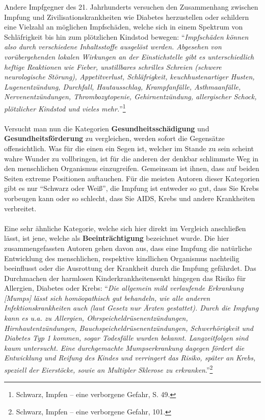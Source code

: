 \documentclass[
    a4paper,
    12pt,
    hyphens,
    chapterprefix=true,
    headheight=33pt,
    footheight=29pt,
    headings=optiontohead, %
]{scrartcl}
\begin{document}
{Andere Impfgegner des 21. Jahrhunderts versuchen den Zusammenhang zwischen Impfung und Zivilisationskrankheiten wie Diabetes herzustellen oder schildern eine Vielzahl an möglichen Impfschäden, welche sich in einem Spektrum von Schläfrigkeit bis hin zum plötzlichen Kindstod bewegen: "`\textit{Impfschäden können also durch verschiedene Inhaltsstoffe ausgelöst werden. Abgesehen von vorübergehenden lokalen Wirkungen an der Einstichstelle gibt es unterschiedlich heftige Reaktionen wie Fieber, unstillbares schrilles Schreien (schwere neurologische Störung), Appetitverlust, Schläfrigkeit, keuchhustenartiger Husten, Lugenentzündung, Durchfall, Hautausschlag, Krampfanfälle, Asthmaanfälle, Nervenentzündungen, Thrombozytopenie, Gehirnentzündung, allergischer Schock, plötzlicher Kindstod und vieles mehr.}"'\footnote{Schwarz, Impfen -- eine verborgene Gefahr, S. 49.}\\
\\
Versucht man nun die Kategorien \textbf{Gesundheitsschädigung} und \textbf{Gesundheitsförderung} zu vergleichen, werden sofort die Gegensätze offensichtlich. Was für die einen ein Segen ist, welcher im Stande zu sein scheint wahre Wunder zu vollbringen, ist für die anderen der denkbar schlimmste Weg in den menschlichen Organismus einzugreifen. Gemeinsam ist ihnen, dass auf beiden Seiten extreme Positionen auftauchen. Für die meisten Autoren dieser Kategorien gibt es nur "`Schwarz oder Weiß"', die Impfung ist entweder so gut, dass Sie Krebs vorbeugen kann oder so schlecht, dass Sie AIDS, Krebs und andere Krankheiten verbreitet. \\
\\
Eine sehr ähnliche Kategorie, welche sich hier direkt im Vergleich anschließen lässt, ist jene, welche als \textbf{Beeinträchtigung} bezeichnet wurde. Die hier zusammengefassten Autoren gehen davon aus, dass eine Impfung die natürliche Entwicklung des menschlichen, respektive kindlichen Organismus nachteilig beeinflusst oder die Ausrottung der Krankheit durch die Impfung gefährdet. Das Durchmachen der \glqq harmlosen Kinderkrankheiten\grqq senkt hingegen das Risiko für Allergien, Diabetes oder Krebs: "`\textit{Die allgemein mild verlaufende Erkrankung [Mumps] lässt sich homöopathisch gut behandeln, wie alle anderen Infektionskrankheiten auch (laut Gesetz nur Ärzten gestattet). Durch die Impfung kann es u.a. zu Allergien, Ohrspeicheldrüsenentzündungen, Hirnhautentzündungen, Bauchspeicheldrüsenentzündungen, Schwerhörigkeit und Diabetes Typ 1 kommen, sogar Todesfälle wurden bekannt. Langzeitfolgen sind kaum untersucht. Eine durchgemachte Mumpserkrankung dagegen fördert die Entwicklung und Reifung des Kindes und verringert das Risiko, später an Krebs, speziell der Eierstöcke, sowie an Multipler Sklerose zu erkranken}."'\footnote{Schwarz, Impfen -- eine verborgene Gefahr, 101.}\\
}
\end{document}
